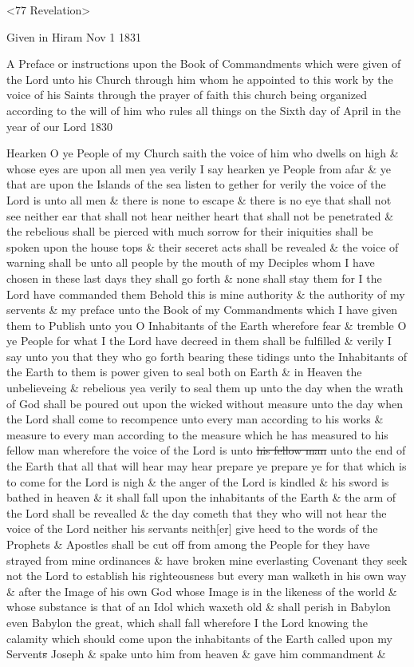 {				\begin{tightcenter}
				<77 Revelation>
				\end{tightcenter}
				
				Given in Hiram Nov 1 1831
				
				A Preface or instructions upon the Book of Commandments which were given of the Lord unto his Church through him whom he appointed to this work by the voice of his Saints through the prayer of faith this church being organized according to the will of him who rules all things on the Sixth day of April in the year of our Lord 1830
				
				Hearken O ye People of my Church saith the voice of him who dwells on high \& whose eyes are upon all men yea verily I say hearken ye People from afar \& ye that are upon the Islands of the sea listen to gether for verily the voice of the Lord is unto all men \& there is none to escape \& there is no eye that shall not see neither ear that shall not hear neither heart that shall not be penetrated \& the rebelious shall be pierced with much sorrow for their iniquities shall be spoken upon the house tops \& their seceret acts shall be revealed \& the voice of warning shall be unto all people by the mouth of my Deciples whom I have chosen in these last days they shall go forth \& none shall stay them for I the Lord have commanded them Behold this is mine authority \& the authority of my servents \& my preface unto the Book of my Commandments which I have given them to Publish unto you O Inhabitants of the Earth wherefore fear \& tremble O ye People for what I the Lord have decreed in them shall be fulfilled \& verily I say unto you that they who go forth bearing these tidings unto the Inhabitants of the Earth to them is power given to seal both on Earth \& in Heaven the unbelieveing \& rebelious yea verily to seal them up unto the day when the wrath of God shall be poured out upon the wicked without measure unto the day when the Lord shall come to recompence unto every man according to his works \& measure to every man according to the measure which he has measured to his fellow man wherefore the voice of the Lord is unto \sout{his fellow man} unto the end of the Earth that all that will hear may hear prepare ye prepare ye for that which is to come for the Lord is nigh \& the anger of the Lord is kindled \& his sword is bathed in heaven \& it shall fall upon the inhabitants of the Earth \& the arm of the Lord shall be revealled \& the day cometh that they who will not hear the voice of the Lord neither his servants neith[er] give heed to the words of the Prophets \& Apostles shall be cut off from among the People for they have strayed from mine ordinances \& have broken mine everlasting Covenant they seek not the Lord to establish his righteousness but every man walketh in his own way \& after the Image of his own God whose Image is in the likeness of the world \& whose substance is that of an Idol which waxeth old \& shall perish in Babylon even Babylon the great, which shall fall wherefore I the Lord knowing the calamity which should come upon the inhabitants of the Earth called upon my Servent\sout{s} Joseph \& spake unto him from heaven \& gave him commandment \& }

